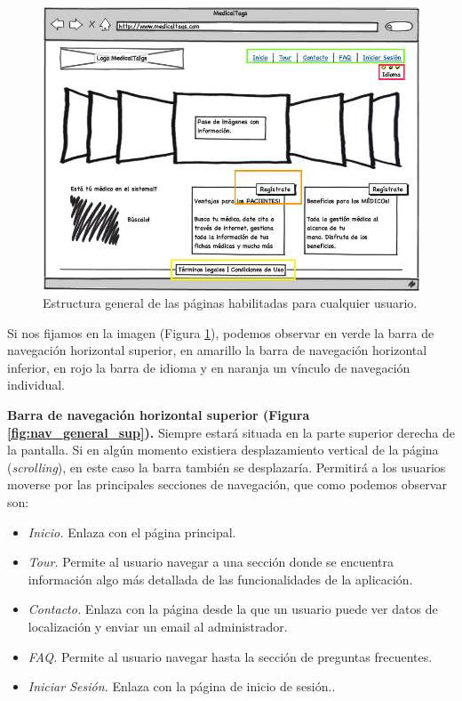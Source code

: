 		\begin{figure}[H]
		  \centering
		    \includegraphics[width=15cm]{img/jpg/nav/general.jpg}
		  \caption{Estructura general de las páginas habilitadas para cualquier usuario.}
		  \label{fig:nav_general}
		\end{figure}
		
		Si nos fijamos en la imagen (Figura \ref{fig:nav_general}), podemos observar en verde la barra de navegación horizontal superior, en amarillo la barra de navegación horizontal inferior, en rojo la barra de idioma y en naranja un vínculo de navegación individual.
		
		\textbf{Barra de navegación horizontal superior (Figura \ref{fig:nav_general_sup}).} Siempre estará situada en la parte superior derecha de la pantalla. Si en algún momento existiera desplazamiento vertical de la página (\textit{scrolling}), en este caso la barra también se desplazaría. Permitirá a los usuarios moverse por las principales secciones de navegación, que como podemos observar son:
		\begin{itemize}
			\item \textit{Inicio.} Enlaza con el página principal.
			\item \textit{Tour.} Permite al usuario navegar a una sección donde se encuentra información algo más detallada de las funcionalidades de la aplicación.
			\item \textit{Contacto.} Enlaza con la página desde la que un usuario puede ver datos de localización y enviar un email al administrador.
			\item \textit{FAQ.} Permite al usuario navegar hasta la sección de preguntas frecuentes.
			\item \textit{Iniciar Sesión.} Enlaza con la página de inicio de sesión..
		\end{itemize}
		
